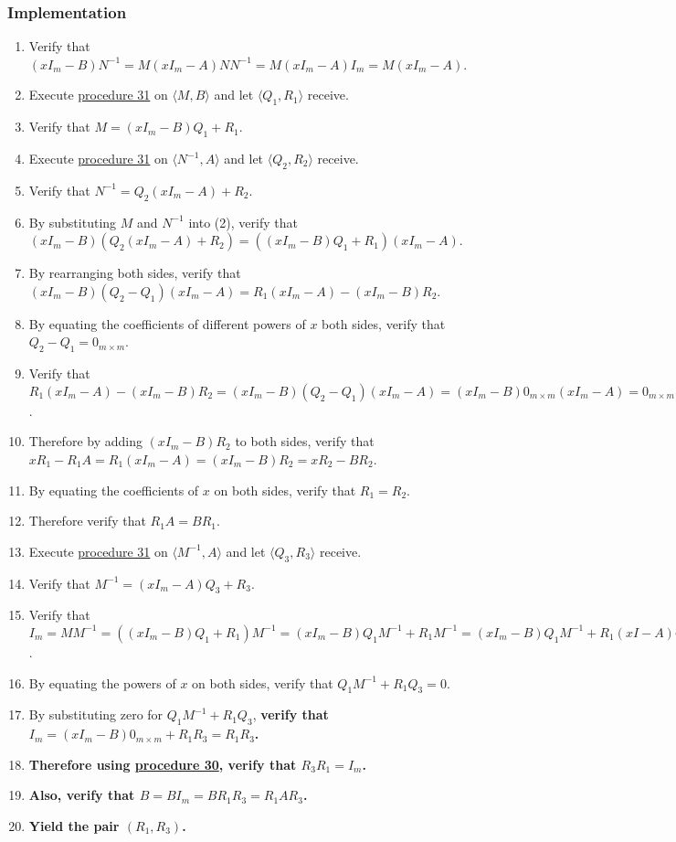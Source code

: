 \documentclass[twocolumn]{article}
\begin{document}
			\subsubsection{Implementation}
				\begin{enumerate}
					\item Verify that $(xI_m-B)N^{-1}=M(xI_m-A)NN^{-1}=M(xI_m-A)I_m=M(xI_m-A)$.
					\item Execute \hyperref[sec:procedure 31]{procedure 31} on $\langle M,B\rangle$ and let $\langle Q_1,R_1\rangle$ receive.
					\item Verify that $M=(xI_m-B)Q_1+R_1$.
					\item Execute \hyperref[sec:procedure 31]{procedure 31} on $\langle N^{-1},A\rangle$ and let $\langle Q_2,R_2\rangle$ receive.
					\item Verify that $N^{-1}=Q_2(xI_m-A)+R_2$.
					\item By substituting $M$ and $N^{-1}$ into (2), verify that $(xI_m-B)(Q_2(xI_m-A)+R_2)=((xI_m-B)Q_1+R_1)(xI_m-A)$.
					\item By rearranging both sides, verify that $(xI_m-B)(Q_2-Q_1)(xI_m-A)=R_1(xI_m-A)-(xI_m-B)R_2$.
					\item By equating the coefficients of different powers of $x$ both sides, verify that $Q_2-Q_1=0_{m\times m}$.
					\item Verify that $R_1(xI_m-A)-(xI_m-B)R_2=(xI_m-B)(Q_2-Q_1)(xI_m-A)=(xI_m-B)0_{m\times m}(xI_m-A)=0_{m\times m}$.
					\item Therefore by adding $(xI_m-B)R_2$ to both sides, verify that $xR_1-R_1A=R_1(xI_m-A)=(xI_m-B)R_2=xR_2-BR_2$.
					\item By equating the coefficients of $x$ on both sides, verify that $R_1=R_2$.
					\item Therefore verify that $R_1A=BR_1$.
					\item Execute \hyperref[sec:procedure 31]{procedure 31} on $\langle M^{-1},A\rangle$ and let $\langle Q_3,R_3\rangle$ receive.
					\item Verify that $M^{-1}=(xI_m-A)Q_3+R_3$.
					\item Verify that $I_m=MM^{-1}=((xI_m-B)Q_1+R_1)M^{-1}=(xI_m-B)Q_1M^{-1}+R_1M^{-1}=(xI_m-B)Q_1M^{-1}+R_1(xI-A)Q_3+R_1R_3=(xI_m-B)Q_1M^{-1}+(xI-B)R_1Q_3+R_1R_3=(xI_m-B)(Q_1M^{-1}+R_1Q_3)+R_1R_3$.
					\item By equating the powers of $x$ on both sides, verify that $Q_1M^{-1}+R_1Q_3=0$.
					\item By substituting zero for $Q_1M^{-1}+R_1Q_3$, \textbf{verify that $I_m=(xI_m-B)0_{m\times m}+R_1R_3=R_1R_3$.}
					\item \textbf{Therefore using \hyperref[sec:procedure 30]{procedure 30}, verify that $R_3R_1=I_m$.}
					\item \textbf{Also, verify that $B=BI_m=BR_1R_3=R_1AR_3$.}
					\item \textbf{Yield the pair $(R_1,R_3)$.}
				\end{enumerate}
\end{document}
